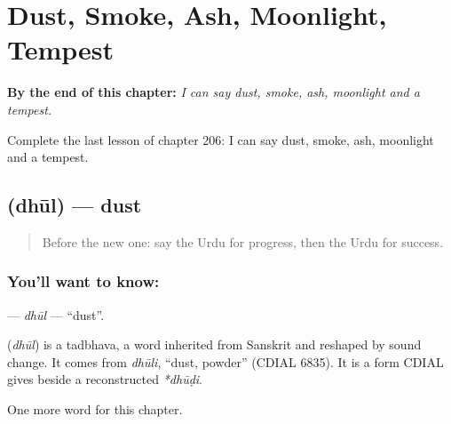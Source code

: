 
\chapter{Dust, Smoke, Ash, Moonlight, Tempest}
\label{ch:ur-dust-smoke-ash-moonlight-tempest}

\begin{chapteropening}
\textbf{By the end of this chapter:} \emph{I can say dust, smoke, ash, moonlight and a tempest.}

Complete the last lesson of chapter 206: I can say dust, smoke, ash, moonlight and a tempest.
\end{chapteropening}

\section[\texorpdfstring{\ur{دھول} (dhūl)}{دھول (dhūl)}]{ (dhūl) — dust}

\label{lesson:UR-C206-dhul}



\begin{quote}
Before the new one: say the Urdu for progress, then the Urdu for success.
\end{quote}

\subsection*{You'll want to know: }
\textbf{} — \emph{dhūl} — \textquotedblleft{}dust\textquotedblright{}.

\begin{cousinweb}
\textbf{} (\emph{dhūl}) is a tadbhava, a word inherited from Sanskrit and reshaped by sound change. It comes from \emph{dhūli}, \textquotedblleft{}dust, powder\textquotedblright{} (CDIAL 6835). It is a form CDIAL gives beside a reconstructed \emph{*dhūḍi}.
\end{cousinweb}

\begin{grammarlens}[title={What you've built}]
One more word for this chapter.
\end{grammarlens}

